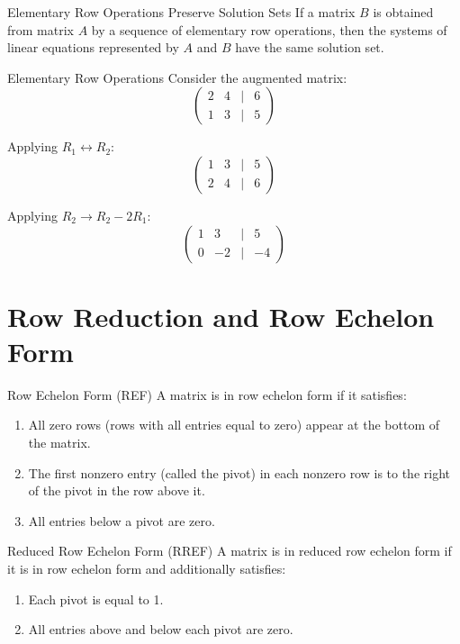 \documentclass[12pt,a4paper]{article}
\begin{document}
	\begin{theorem}{Elementary Row Operations Preserve Solution Sets}
		If a matrix $B$ is obtained from matrix $A$ by a sequence of elementary row operations, then the systems of linear equations represented by $A$ and $B$ have the same solution set.
	\end{theorem}
	
	\begin{example}{Elementary Row Operations}
		Consider the augmented matrix:
		\[
		\begin{pmatrix} 2 & 4 & | & 6 \\ 1 & 3 & | & 5 \end{pmatrix}
		\]
		
		Applying $R_1 \leftrightarrow R_2$:
		\[
		\begin{pmatrix} 1 & 3 & | & 5 \\ 2 & 4 & | & 6 \end{pmatrix}
		\]
		
		Applying $R_2 \to R_2 - 2R_1$:
		\[
		\begin{pmatrix} 1 & 3 & | & 5 \\ 0 & -2 & | & -4 \end{pmatrix}
		\]
	\end{example}
	
	\section{Row Reduction and Row Echelon Form}
	
	\begin{definition}{Row Echelon Form (REF)}
		A matrix is in row echelon form if it satisfies:
		\begin{enumerate}[label=(\roman*)]
			\item All zero rows (rows with all entries equal to zero) appear at the bottom of the matrix.
			\item The first nonzero entry (called the pivot) in each nonzero row is to the right of the pivot in the row above it.
			\item All entries below a pivot are zero.
		\end{enumerate}
	\end{definition}
	
	\begin{definition}{Reduced Row Echelon Form (RREF)}
		A matrix is in reduced row echelon form if it is in row echelon form and additionally satisfies:
		\begin{enumerate}[label=(\roman*), resume]
			\item Each pivot is equal to 1.
			\item All entries above and below each pivot are zero.
		\end{enumerate}
	\end{definition}
	
\end{document}

